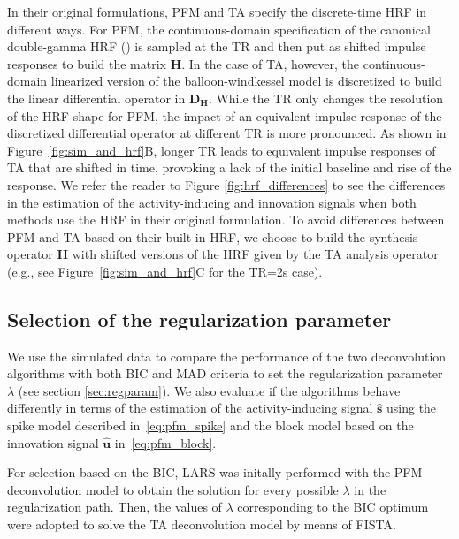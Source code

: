 In their original formulations, PFM and TA specify the discrete-time HRF in different ways. For PFM, the continuous-domain specification of the canonical double-gamma HRF (\citealt{HENSON2007178}) is sampled at the TR and then put as shifted impulse responses to build the matrix $\mathbf{H}$.  In the case of TA, however, the continuous-domain linearized version of the balloon-windkessel model is discretized to build the linear differential operator in $\mathbf{D_H}$. While the TR only changes the resolution of the HRF shape for PFM, the impact of an equivalent impulse response of the discretized differential operator at different TR is more pronounced. As shown in Figure~\ref{fig:sim_and_hrf}B, longer TR leads to equivalent impulse responses of TA that are shifted in time, provoking a lack of the initial baseline and rise of the response. We refer the reader to Figure {\ref{fig:hrf_differences}} to see the differences in the estimation of the activity-inducing and innovation signals when both methods use the HRF in their original formulation. To avoid differences between PFM and TA based on their built-in HRF, we choose to build the synthesis operator $\mathbf{H}$ with shifted versions of the HRF given by the TA analysis operator (e.g., see Figure~\ref{fig:sim_and_hrf}C for the TR=2s case).

\subsection{Selection of the regularization parameter}

We use the simulated data to compare the performance of the two deconvolution algorithms with both BIC and MAD criteria to set the regularization parameter $\lambda$ (see section \ref{sec:regparam}). We also evaluate if the algorithms behave differently in terms of the estimation of the activity-inducing signal $\mathbf{\hat{s}}$ using the spike model described in~\eqref{eq:pfm_spike} and the block model based on the innovation signal $\mathbf{\hat{u}}$ in~\eqref{eq:pfm_block}.

For selection based on the BIC, LARS was initally performed with the PFM deconvolution model to obtain the solution for every possible $\lambda$ in the regularization path. Then, the values of $\lambda$ corresponding to the BIC optimum were adopted to solve the TA deconvolution model by means of FISTA. 


